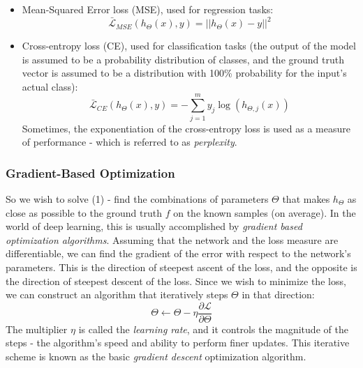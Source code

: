 \documentclass{article}
\begin{document}
\begin{itemize}
    \item
        Mean-Squared Error loss (MSE), used for regression tasks:
        \begin{equation*}
            \bar{\mathcal{L}}_{MSE}(h_\Theta(x), y) = ||h_\Theta(x) - y||^2
        \end{equation*}
    \item
        Cross-entropy loss (CE), used for classification tasks (the output of the model is assumed to be a probability distribution of classes, and the ground truth vector is assumed to be a distribution with 100\% probability for the input's actual class):
        \begin{equation*}
            \bar{\mathcal{L}}_{CE}(h_\Theta(x), y) = -\sum_{j=1}^{m}{y_j \log(h_{\Theta,j}(x))}
        \end{equation*}
        Sometimes, the exponentiation of the cross-entropy loss is used as a measure of performance - which is referred to as \emph{perplexity}.
\end{itemize}

\subsubsection{Gradient-Based Optimization}
\label{subsec:gradient}

So we wish to solve (1) - find the combinations of parameters $\Theta$ that makes $h_\Theta$ as close as possible to the ground truth $f$ on the known samples (on average). In the world of deep learning, this is usually accomplished by \emph{gradient based optimization algorithms}. Assuming that the network and the loss measure are differentiable, we can find the gradient of the error with respect to the network's parameters. This is the direction of steepest ascent of the loss, and the opposite is the direction of steepest descent of the loss. Since we wish to minimize the loss, we can construct an algorithm that iteratively steps $\Theta$ in that direction:
\begin{equation*}
    \Theta \gets \Theta - \eta \frac{\partial \mathcal{L}}{\partial \Theta}
\end{equation*}
The multiplier $\eta$ is called the \emph{learning rate}, and it controls the magnitude of the steps - the algorithm's speed and ability to perform finer updates. This iterative scheme is known as the basic \emph{gradient descent} optimization algorithm.
\end{document}
